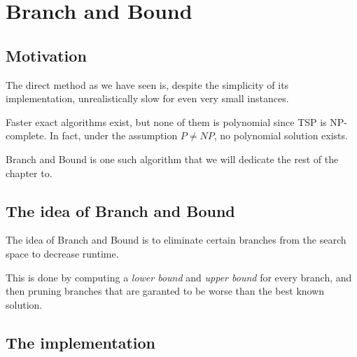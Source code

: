 \chapter{Branch and Bound}

\section{Motivation}

    The direct method as we have seen is, despite the simplicity of its implementation, unrealistically slow for even very small instances. 
    
    Faster exact algorithms exist, but none of them is polynomial since TSP is NP-complete. In fact, under the assumption \(P\neq NP\), no polynomial solution exists.

    Branch and Bound is one such algorithm that we will dedicate the rest of the chapter to.

\section{The idea of Branch and Bound}

    The idea of Branch and Bound is to eliminate certain branches from the search space to decrease runtime.

    This is done by computing a \emph{lower bound} and \emph{upper bound} for every branch, and then pruning branches that are garanted to be worse than the best known solution.

\section{The implementation}